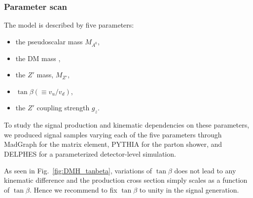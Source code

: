  
\subsubsection{Parameter scan}
 
 The model is described by five parameters:
 \begin{itemize}
 	\item the pseudoscalar mass $M_{A^0}$,
 	\item the DM mass \mdm, 	 
 	\item the $Z'$ mass, $M_{Z'}$,
    \item $\tan{\beta} (\equiv v_u/v_d)$,
 	\item the $Z'$ coupling strength $g_z$. 
 \end{itemize}

 To study the signal production and kinematic dependencies on these parameters, 
 we produced signal samples varying each of the five parameters through 
 MadGraph for the matrix element, PYTHIA for the parton shower, and DELPHES\cite{deFavereau:2013fsa} 
for a parameterized detector-level simulation.
 
 As seen in Fig.~\ref{fig:DMH_tanbeta}, variations of $\tan{\beta}$ does not lead to any kinematic 
 difference and the production cross section simply scales as a function of $\tan{\beta}$. Hence 
we recommend to fix $\tan{\beta}$ to unity in the signal generation. 

